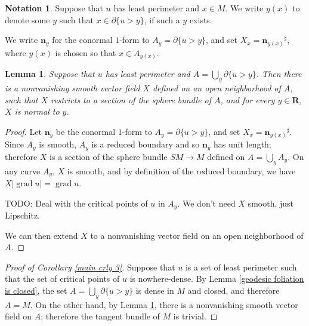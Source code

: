 \documentclass[reqno,12pt,letterpaper]{amsart}
\newcommand{\RR}{\mathbf{R}}
\DeclareMathOperator{\grad}{grad}
\newcommand{\normal}{\mathbf n}
\newtheorem{lemma}[theorem]{Lemma}
\theoremstyle{definition}
\newtheorem{notation}[theorem]{Notation}
\numberwithin{equation}{section}
\begin{document}
\begin{notation}
Suppose that $u$ has least perimeter and $x \in M$.
We write $y(x)$ to denote some $y$ such that $x \in \partial \{u > y\}$, if such a $y$ exists.
\end{notation}
We write $\normal_y$ for the conormal $1$-form to $A_y = \partial \{u > y\}$, and set $X_x = {\normal_{y(x)}}^\sharp$, where $y(x)$ is chosen so that $x \in A_{y(x)}$.

\begin{lemma}\label{existence of normal field}
Suppose that $u$ has least perimeter and $A = \bigcup_y \partial \{u > y\}$.
Then there is a nonvanishing smooth vector field $X$ defined on an open neighborhood of $A$, such that $X$ restricts to a section of the sphere bundle of $A$, and for every $y \in \RR$, $X$ is normal to $y$.
\end{lemma}
\begin{proof}
Let $\normal_y$ be the conormal $1$-form to $A_y = \partial \{u > y\}$, and set $X_x = {\normal_{y(x)}}^\sharp$.
Since $A_y$ is smooth, $A_y$ is a reduced boundary and so $\normal_y$ has unit length; therefore $X$ is a section of the sphere bundle $SM \to M$ defined on $A = \bigcup_y A_y$.
On any curve $A_y$, $X$ is smooth, and by definition of the reduced boundary, we have $X|\grad u| = \grad u$.

TODO: Deal with the critical points of $u$ in $A_y$. We don't need $X$ smooth, just Lipschitz.

We can then extend $X$ to a nonvanishing vector field on an open neighborhood of $A$.
\end{proof}

\begin{proof}[Proof of Corollary \ref{main crly 3}]
Suppose that $u$ is a set of least perimeter such that the set of critical points of $u$ is nowhere-dense.
By Lemma \ref{geodesic foliation is closed}, the set $A = \bigcup_y \partial \{u > y\}$ is dense in $M$ and closed, and therefore $A = M$.
On the other hand, by Lemma \ref{existence of normal field}, there is a nonvanishing smooth vector field on $A$; therefore the tangent bundle of $M$ is trivial.
\end{proof}
\end{document}

